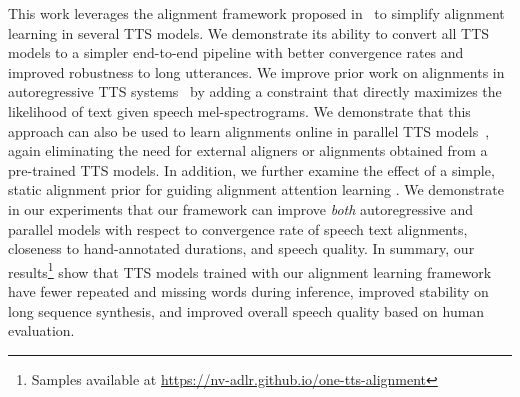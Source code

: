 
 This work leverages the alignment framework proposed in~\cite{rad_tts} to simplify alignment learning in several TTS models. We demonstrate its ability to convert all TTS models to a simpler end-to-end pipeline with better convergence rates and improved robustness to long utterances. We improve prior work on alignments in autoregressive TTS systems~\cite{Tacotron, Tacotron2, Flowtron} by adding a constraint that directly maximizes the likelihood of text given speech mel-spectrograms. We demonstrate that this approach can also be used to learn alignments online in parallel TTS models~\cite{lancucki2020fastpitch, fastspeech2, rad_tts}, again eliminating the need for external aligners or alignments obtained from a pre-trained TTS models. In addition, we further examine the effect of a simple, static alignment prior for guiding alignment attention learning \cite{tachibana2018efficiently, rad_tts}.
 We demonstrate in our experiments that our framework can improve \emph{both} autoregressive and parallel models with respect to convergence rate of speech text alignments, closeness to hand-annotated durations, and speech quality. In summary, our results\footnote{Samples available at \hyperlink{https://nv-adlr.github.io/one-tts-alignment}{https://nv-adlr.github.io/one-tts-alignment}} show that TTS models trained with our alignment learning framework have fewer repeated and missing words during inference, improved stability on long sequence synthesis, and improved overall speech quality based on human evaluation.